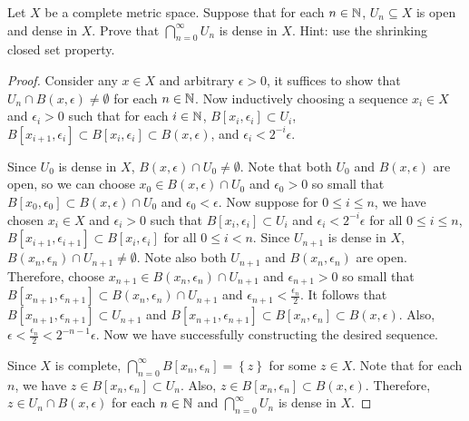 \documentclass[a4paper]{article}
\begin{document}
\begin{thm}
Let $X$ be a complete metric space.  Suppose that for each $n \in \mathbb{N}$, $U_n \subseteq X$ is open and dense in $X$.  Prove that $\bigcap_{n=0}^\infty U_n$ is dense in $X$.  Hint: use the shrinking closed set property.
\end{thm}

\begin{proof}
  Consider any $x \in X$ and arbitrary $\epsilon > 0$, it
  suffices to show that $U_n \cap B(x, \epsilon)
  \neq \emptyset$ for each $n \in \mathbb{N}$. 
  Now inductively choosing a sequence 
  $x_i \in X$ and $\epsilon_i > 0$ such that 
  for each $i \in \mathbb{N}$, $B[x_i, \epsilon_i] \subset U_i$,
  $B[x_{i+1}, \epsilon_i] \subset B[x_i, \epsilon_i]
  \subset B(x, \epsilon)$, and $\epsilon_i < 2^{-i} \epsilon$.
  
  Since $U_0$ is dense in $X$,
  $B(x, \epsilon) \cap U_0 \neq \emptyset$.
  Note that both $U_0$ and $B(x, \epsilon)$ are open, so
  we can choose $x_0 \in B(x, \epsilon) \cap U_0$ 
  and $\epsilon_0 > 0$ so small 
  that $B[x_0, \epsilon_0] \subset B(x, \epsilon) \cap U_0$
  and $\epsilon_0 < \epsilon$. 
  Now suppose 
  for $0 \leq i \leq n$, we have chosen $x_i \in X$ 
  and $\epsilon_i > 0$ such that 
  $B[x_i, \epsilon_i] \subset U_i$ 
  and $\epsilon_i < 2^{-i} \epsilon$ 
  for all $0 \leq i \leq n$,
  $B[x_{i+1}, \epsilon_{i+1}] \subset 
  B[x_i, \epsilon_i]$ for all $0 \leq i < n$.
  Since $U_{n+1}$ is dense in $X$, $B(x_n, \epsilon_n)
  \cap U_{n+1} \neq \emptyset$. Note also both $U_{n+1}$ 
  and $B(x_n, \epsilon_n)$ are open.
  Therefore, choose 
  $x_{n+1} \in B(x_n, \epsilon_n) \cap U_{n+1}$ and 
  $\epsilon_{n+1} > 0$ so small that 
  $B[x_{n+1}, \epsilon_{n+1}] \subset B(x_n, \epsilon_n) 
  \cap U_{n+1}$ and $\epsilon_{n+1} < \frac{\epsilon_n}{2}$. 
  It follows that 
  $B[x_{n+1}, \epsilon_{n+1}] \subset U_{n+1}$ and 
  $B[x_{n+1}, \epsilon_{n+1}] \subset B[x_n, \epsilon_n]
  \subset B(x, \epsilon)$. Also, 
  $\epsilon < \frac{\epsilon_n}{2} < 2^{-n-1} \epsilon$.
  Now we have successfully constructing the desired sequence.
  
  Since $X$ is complete, $\bigcap_{n=0}^\infty B[x_n, \epsilon_n]
  = \left\{ z \right\}$ for some $z \in X$. Note that 
  for each $n$, we have $z \in B[x_n, \epsilon_n] \subset U_n$. 
  Also,
  $z \in B[x_n, \epsilon_n] \subset B(x, \epsilon)$. 
  Therefore, $z \in U_n \cap B(x, \epsilon)$ for each $n \in \mathbb{N}$
  and $\bigcap_{n=0}^\infty U_n$ is dense in $X$.
\end{proof}
\end{document}
